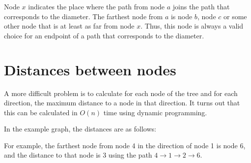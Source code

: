 Node $x$ indicates the place where the path
from node $a$ joins the path that corresponds
to the diameter.
The farthest node from $a$
is node $b$, node $c$ or some other node
that is at least as far from node $x$.
Thus, this node is always a valid choice for
an endpoint of a path that corresponds to the diameter.

\section{Distances between nodes}

A more difficult problem is to calculate
for each node of the tree and for each direction,
the maximum distance to a node in that direction.
It turns out that this can be calculated in
$O(n)$ time using dynamic programming.

\begin{samepage}
In the example graph, the distances are as follows:
\begin{center}
\end{center}
\end{samepage}
For example, the farthest node from node 4
in the direction of node 1 is node 6, and the distance to that
node is 3 using the path
$4 \rightarrow 1 \rightarrow 2 \rightarrow 6$.

